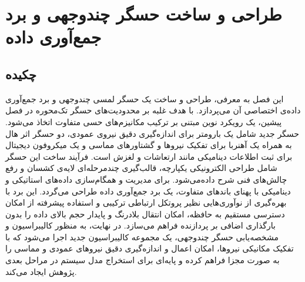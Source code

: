\chapter{ طراحی و ساخت حسگر چندوجهی و برد جمع‌آوری داده}
\section{چکیده}
این فصل به معرفی، طراحی و ساخت یک حسگر لمسی چندوجهی و برد جمع‌آوری داده‌ی اختصاصی آن می‌پردازد. با هدف غلبه بر محدودیت‌های حسگر تک‌محوره در فصل پیشین، یک رویکرد نوین مبتنی بر ترکیب مکانیزم‌های حسی متفاوت اتخاذ می‌شود. حسگر جدید شامل یک بارومتر برای اندازه‌گیری دقیق نیروی عمودی، دو حسگر اثر هال به همراه یک آهنربا برای تفکیک نیروها و گشتاورهای مماسی و یک میکروفون دیجیتال  برای ثبت اطلاعات دینامیکی مانند ارتعاشات و لغزش است. فرآیند ساخت این حسگر شامل طراحی الکترونیکی یکپارچه، قالب‌گیری چندمرحله‌ای لایه‌ی کشسان و رفع چالش‌های فنی شرح داده‌می‌شود. برای مدیریت و همگام‌سازی داده‌های استاتیکی و دینامیکی با پهنای باندهای متفاوت، یک برد جمع‌آوری داده طراحی می‌گردد. این برد با بهره‌گیری از نوآوری‌هایی نظیر پروتکل ارتباطی ترکیبی  و استفاده پیشرفته از امکان دسترسی مستقیم به حافظه، امکان انتقال بلادرنگ و پایدار حجم بالای داده را بدون بارگذاری اضافی بر پردازنده فراهم می‌سازد. در نهایت، به منظور کالیبراسیون و مشخصه‌یابی حسگر چندوجهی، یک مجموعه کالیبراسیون جدید اجرا می‌شود که با تفکیک مکانیکی نیروها، امکان اعمال و اندازه‌گیری دقیق نیروهای عمودی و مماسی را به صورت مجزا فراهم کرده و پایه‌ای برای استخراج مدل سیستم در مراحل بعدی پژوهش ایجاد می‌کند.
